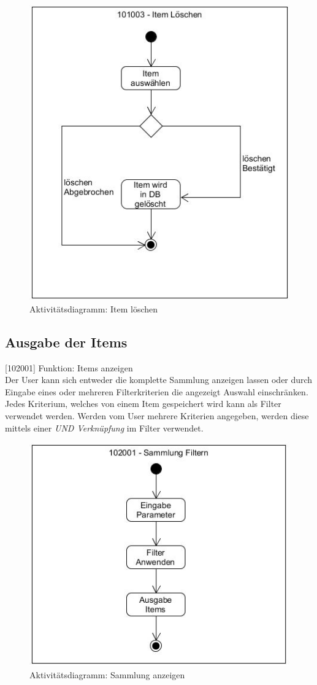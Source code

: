 \begin{figure}[htbp]
	\centering
	\includegraphics[scale=0.6]{pic/101003}
	\caption{Aktivitätsdiagramm: Item löschen}
\end{figure}

\subsection{Ausgabe der Items}

[102001] Funktion: Items anzeigen\\

Der User kann sich entweder die komplette Sammlung anzeigen lassen oder durch Eingabe eines oder mehreren Filterkriterien die angezeigt Auswahl einschränken. Jedes Kriterium, welches von einem Item gespeichert wird kann als Filter verwendet werden. Werden vom User mehrere Kriterien angegeben, werden diese mittels einer \emph{UND Verknüpfung} im Filter verwendet. 

\begin{figure}[htbp]
	\centering
	\includegraphics[scale=0.6]{pic/102001}
	\caption{Aktivitätsdiagramm: Sammlung anzeigen}
\end{figure}

